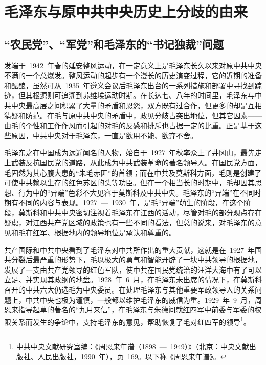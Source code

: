 
\chapter{毛泽东与原中共中央历史上分歧的由来}

\section{“农民党”、“军党”和毛泽东的“书记独裁”问题}

发端于~1942~年春的延安整风运动，在一定意义上是毛泽东长久以来对原中共中央不满的一个总爆发。整风运动的起步有一个漫长的历史演变过程，它的近期的准备和酝酿，虽然可从~1935~年遵义会议后毛泽东出台的一系列措施和部署中寻找到踪迹，但其根源则可追溯到苏维埃运动时期。在长达七、八年的时间里，毛泽东与中共中央最高层之间积累了大量的矛盾和恩怨，双方既有过合作，但更多的却是互相猜疑和防范。在毛与原中共中央的矛盾中，政见分歧占突出地位，但其它因素——由毛的个性和工作作风而引起的对毛的反感和排斥也占据一定的比重。正是基于这些原因，中共中央对于毛泽东，一直是欲用不能、欲弃不舍。

毛泽东之在中国成为远近闻名的人物，始自于~1927~年秋率众上了井冈山，最先走上武装反抗国民党的道路，从此成为中共武装革命的著名领导人。在国民党方面，毛固然为其心腹大患的“朱毛赤匪”的首领；而在中共及莫斯科方面，毛则是创建了可使中共赖以生存的红色苏区的头等功臣。但在一个相当长的时期中，毛却因其思想、行为中的“异端”色彩不大见容于莫斯科及中共中央。毛泽东的“异端”在不同时期有不同的内容与表现。1927~—~1930~年，是毛“异端”萌生的阶段，在这个阶段，莫斯科和中共中央密切注视着毛泽东在江西的活动，尽管对毛的部分观点存在疑虑，对江西共产党区域的政策也有一些不同的看法，但总的说来，对毛泽东的意见和毛在红军、根据地内的领导地位是承认和尊重的。

共产国际和中共中央看到了毛泽东对中共所作出的重大贡献，这就是在~1927~年国共分裂后最严重的形势下，毛以极大的勇气和智能开辟了一块中共领导的根据地，发展了一支由共产党领导的红色军队，使中共在国民党统治的汪洋大海中有了可以立足、并实现其政纲的地盘。1928~年~6~月，在毛泽东未出席的情况下，在莫斯科召开的中共六大仍选毛为中央委员。在处理毛泽东与其他重要军政领导人的关系问题上，中共中央也极为谨慎，一般都以维护毛泽东的威信为重。1929~年~9~月，周恩来指导起草的著名的“九月来信”，在毛泽东与朱德间就红四军中前委与军委的权限关系而发生的争论中，支持毛泽东的意见，帮助恢复了毛对红四军的领导\footnote{中共中央文献研究室编：《周恩来年谱（1898~—~1949）》（北京：中央文献出版社、人民出版社，1990~年），页~169。以下称《周恩来年谱》。}。


